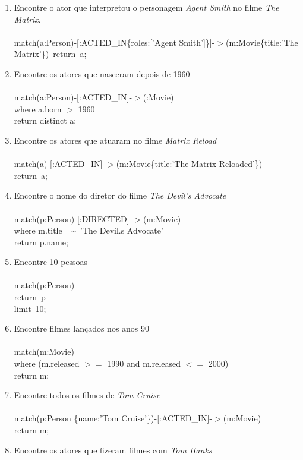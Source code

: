 \documentclass[a4paper, 12pt]{article}
\begin{document}
\begin{enumerate}
\item Encontre o ator que interpretou o personagem \emph{Agent Smith} no filme \emph{The Matrix}. \\ \\
  match(a:Person)-[:ACTED\_IN\{roles:['Agent Smith']\}]-$>$(m:Movie\{title:'The Matrix'\})\
  return\ a; \\
\item Encontre os atores que nasceram depois de 1960 \\ \\
match(a:Person)-[:ACTED\_IN]-$>$(:Movie) \\
where a.born $>$ 1960 \\
return distinct a;
\item Encontre os atores que atuaram no filme \emph{Matrix Reload} \\ \\
  match(a)-[:ACTED\_IN]-$>$(m:Movie\{title:'The Matrix Reloaded'\}) \\
  return\ a; \\
\item Encontre o nome do diretor do filme \emph{The Devil's Advocate} \\ \\
  match(p:Person)-[:DIRECTED]-$>$(m:Movie) \\
  where m.title =\textasciitilde\ 'The Devil.s Advocate' \\
  return p.name; \\
\item Encontre 10 pessoas \\ \\
  match(p:Person) \\
  return\ p \\
  limit\ 10; \\
\item Encontre filmes lançados nos anos 90 \\ \\
  match(m:Movie) \\
  where (m.released $>=$ 1990 and m.released $<=$ 2000) \\
  return m;
\item Encontre todos os filmes de \emph{Tom Cruise} \\ \\
  match(p:Person \{name:'Tom Cruise'\})-[:ACTED\_IN]-$>$(m:Movie) \\
  return m; \\
\item Encontre os atores que fizeram filmes com \emph{Tom Hanks} \\

\end{enumerate}
\end{document}
